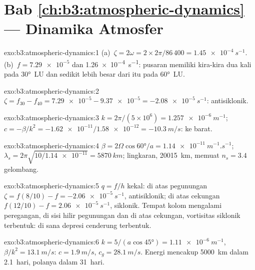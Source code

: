 \section*{Bab \ref{ch:b3:atmospheric-dynamics} --- Dinamika Atmosfer}

\begin{solution}{exo:b3:atmospheric-dynamics:1}
(a)~$\zeta = 2\omega = 2\times2\pi/86\,400 = \qty{1.45e-4}{s^{-1}}$.
(b)~$f = \num{7.29e-5}$ dan \qty{1.26e-4}{s^{-1}}: pusaran memiliki kira-kira
dua kali  pada \ang{30}~LU dan sedikit lebih besar dari itu pada
\ang{60}~LU.
\end{solution}

\begin{solution}{exo:b3:atmospheric-dynamics:2}
$\zeta = f_{30} - f_{40} = \num{7.29e-5} - \num{9.37e-5} =
\qty{-2.08e-5}{s^{-1}}$: antisiklonik.
\end{solution}

\begin{solution}{exo:b3:atmospheric-dynamics:3}
$k = 2\pi/(5\times10^6) = \qty{1.257e-6}{m^{-1}}$; $c = -\beta/k^2 =
-\num{1.62e-11}/\num{1.58e-12} = \qty{-10.3}{m/s}$: ke barat.
\end{solution}

\begin{solution}{exo:b3:atmospheric-dynamics:4}
$\beta = 2\Omega\cos\ang{60}/a = \qty{1.14e-11}{m^{-1}.s^{-1}}$;
$\lambda_s = 2\pi\sqrt{10/\num{1.14e-11}} = \qty{5870}{km}$; lingkaran,
\qty{20015}{km}, memuat $n_s = 3.4$ gelombang.
\end{solution}

\begin{solution}{exo:b3:atmospheric-dynamics:5}
$q = f/h$ kekal: di atas pegunungan $\zeta = f(8/10) - f =
\qty{-2.06e-5}{s^{-1}}$, antisiklonik; di atas cekungan $f(12/10) - f =
\qty{+2.06e-5}{s^{-1}}$, siklonik. Tempat kolom mengalami peregangan, di sisi hilir
pegunungan dan di atas cekungan, vortisitas siklonik terbentuk: di sana
depresi cenderung terbentuk.
\end{solution}

\begin{solution}{exo:b3:atmospheric-dynamics:6}
$k = 5/(a\cos\ang{45}) = \qty{1.11e-6}{m^{-1}}$, $\beta/k^2 =
\qty{13.1}{m/s}$: $c = \qty{1.9}{m/s}$, $c_g = \qty{28.1}{m/s}$. Energi
mencakup \qty{5000}{km} dalam \num{2.1}~hari, polanya dalam \num{31}~hari.
\end{solution}

